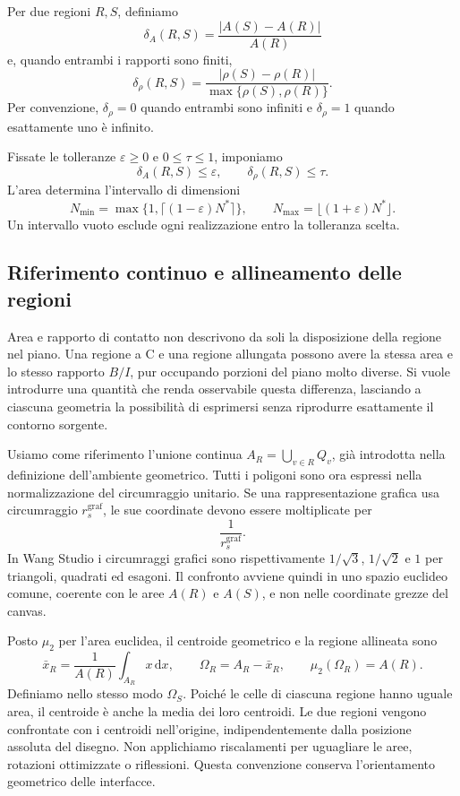 \documentclass[11pt,a4paper]{article}
\begin{document}
Per due regioni $R,S$, definiamo
\[
\delta_A(R,S)=\frac{|A(S)-A(R)|}{A(R)}
\]
e, quando entrambi i rapporti sono finiti,
\[
\delta_\rho(R,S)=
\frac{|\rho(S)-\rho(R)|}{\max\{\rho(S),\rho(R)\}}.
\]
Per convenzione, $\delta_\rho=0$ quando entrambi sono infiniti e $\delta_\rho=1$ quando esattamente uno è infinito.

Fissate le tolleranze $\varepsilon\geq0$ e $0\leq\tau\leq1$, imponiamo
\[
\delta_A(R,S)\leq\varepsilon,
\qquad \delta_\rho(R,S)\leq\tau.
\]
L'area determina l'intervallo di dimensioni
\[
N_{\min}=\max\{1,\lceil(1-\varepsilon)N^*\rceil\},
\qquad N_{\max}=\lfloor(1+\varepsilon)N^*\rfloor.
\]
Un intervallo vuoto esclude ogni realizzazione entro la tolleranza scelta.

\subsection{Riferimento continuo e allineamento delle regioni}
\label{sec:campo-continuo}

Area e rapporto di contatto non descrivono da soli la disposizione della regione nel piano. Una regione a C e una regione allungata possono avere la stessa area e lo stesso rapporto $B/I$, pur occupando porzioni del piano molto diverse. Si vuole introdurre una quantità che renda osservabile questa differenza, lasciando a ciascuna geometria la possibilità di esprimersi senza riprodurre esattamente il contorno sorgente.

Usiamo come riferimento l'unione continua $A_R=\bigcup_{v\in R}Q_v$, già introdotta nella definizione dell'ambiente geometrico. Tutti i poligoni sono ora espressi nella normalizzazione del circumraggio unitario. Se una rappresentazione grafica usa circumraggio $r_s^{\mathrm{graf}}$, le sue coordinate devono essere moltiplicate per
\[
\frac{1}{r_s^{\mathrm{graf}}}.
\]
In Wang Studio i circumraggi grafici sono rispettivamente $1/\sqrt{3}$, $1/\sqrt{2}$ e $1$ per triangoli, quadrati ed esagoni. Il confronto avviene quindi in uno spazio euclideo comune, coerente con le aree $A(R)$ e $A(S)$, e non nelle coordinate grezze del canvas.

Posto $\mu_2$ per l'area euclidea, il centroide geometrico e la regione allineata sono
\[
\bar x_R=\frac{1}{A(R)}\int_{A_R}x\,\mathrm dx,
\qquad \Omega_R=A_R-\bar x_R,
\qquad \mu_2(\Omega_R)=A(R).
\]
Definiamo nello stesso modo $\Omega_S$. Poiché le celle di ciascuna regione hanno uguale area, il centroide è anche la media dei loro centroidi. Le due regioni vengono confrontate con i centroidi nell'origine, indipendentemente dalla posizione assoluta del disegno. Non applichiamo riscalamenti per uguagliare le aree, rotazioni ottimizzate o riflessioni. Questa convenzione conserva l'orientamento geometrico delle interfacce.
\end{document}
